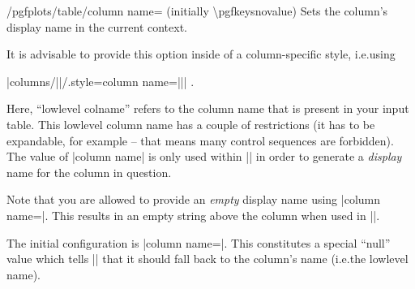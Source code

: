 \documentclass[a4paper]{ltxdoc}
\begin{document}
\begin{key}{/pgfplots/table/column name= (initially \textbackslash pgfkeysnovalue)}
    Sets the column's display name in the current context.

    It is advisable to provide this option inside of a column-specific style,
    i.e.\@ using

    |columns/||/.style={column name=||}| .

    Here, ``lowlevel colname'' refers to the column name that is present in
    your input table. This lowlevel column name has a couple of restrictions
    (it has to be expandable, for example -- that means many control sequences
    are forbidden). The value of |column name| is only used within
    |\pgfplotstabletypeset| in order to generate a \emph{display} name for the
    column in question.

    Note that you are allowed to provide an \emph{empty} display name using
    |column name={}|. This results in an empty string above the column when
    used in |\pgfplotstabletypeset|.

    The initial configuration is |column name=\pgfkeysnovalue|. This
    constitutes a special ``null'' value which tells |\pgfplotstabletypeset|
    that it should fall back to the column's name (i.e.\@ the lowlevel name).
\end{key}

\end{document}
